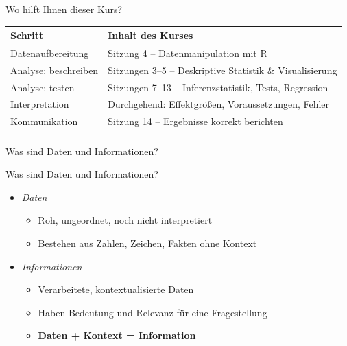 \documentclass[
  ignorenonframetext,
]{beamer}
\newcounter{none} %
\providecommand{\tightlist}{%
  \setlength{\itemsep}{0pt}\setlength{\parskip}{0pt}}
\begin{document}
\begin{frame}{Wo hilft Ihnen dieser Kurs?}
\protect{}\label{wo-hilft-ihnen-dieser-kurs}
{\def\LTcaptype{none} %
\begin{longtable}[]{@{}
  >{\raggedright\arraybackslash}p{}
  >{\raggedright\arraybackslash}p{}@{}}
\toprule\noalign{}
\begin{minipage}[b]{\linewidth}\raggedright
Schritt
\end{minipage} & \begin{minipage}[b]{\linewidth}\raggedright
Inhalt des Kurses
\end{minipage} \\
\midrule\noalign{}
\endhead
Datenaufbereitung & Sitzung 4 -- Datenmanipulation mit R \\
Analyse: beschreiben & Sitzungen 3--5 -- Deskriptive Statistik \&
Visualisierung \\
Analyse: testen & Sitzungen 7--13 -- Inferenzstatistik, Tests,
Regression \\
Interpretation & Durchgehend: Effektgrößen, Voraussetzungen, Fehler \\
Kommunikation & Sitzung 14 -- Ergebnisse korrekt berichten \\
\bottomrule\noalign{}
\end{longtable}
}
\end{frame}

\begin{frame}{Was sind Daten und Informationen?}
\protect{}\label{was-sind-daten-und-informationen}
\end{frame}

\begin{frame}{Was sind Daten und Informationen?}
\protect{}\label{was-sind-daten-und-informationen-1}
\begin{itemize}
\tightlist
\item
  \emph{Daten}

  \begin{itemize}
  \tightlist
  \item
    Roh, ungeordnet, noch nicht interpretiert
  \item
    Bestehen aus Zahlen, Zeichen, Fakten ohne Kontext
  \end{itemize}
\item
  \emph{Informationen}

  \begin{itemize}
  \tightlist
  \item
    Verarbeitete, kontextualisierte Daten
  \item
    Haben Bedeutung und Relevanz für eine Fragestellung
  \item
    \textbf{Daten + Kontext = Information}
  \end{itemize}
\end{itemize}
\end{frame}
\end{document}
